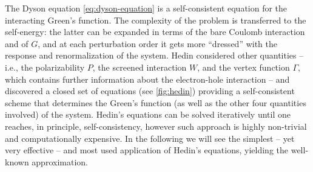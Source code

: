 The Dyson equation \eqref{eq:dyson-equation} is a self-consistent equation for the interacting Green's function. The complexity of the problem is transferred to the self-energy: the latter can be expanded in terms of the bare Coulomb interaction and of $G$, and at each perturbation order it gets more ``dressed'' with the response and renormalization of the system. Hedin considered other quantities -- i.e., the polarizability $P$, the screened interaction $W$, and the vertex function $\Gamma$, which contains further information about the electron-hole interaction -- and discovered a closed set of equations (see \cref{fig:hedin}) providing a self-consistent scheme that determines the Green's function (as well as the other four quantities involved) of the system. Hedin's equations can be solved iteratively until one reaches, in principle, self-consistency, however such approach is highly non-trivial and computationally expensive. In the following we will see the simplest -- yet very effective -- and most used application of Hedin's equations, yielding the well-known \gw approximation.

